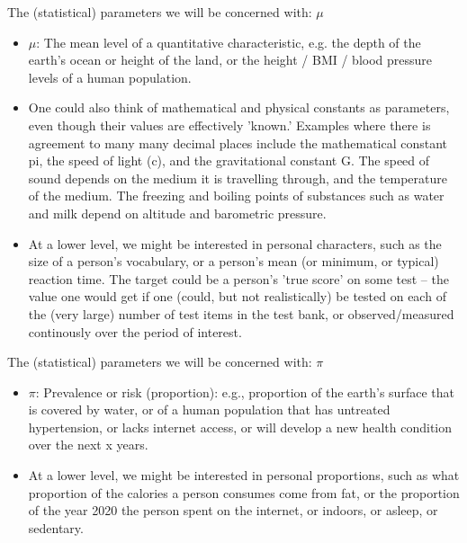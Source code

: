\documentclass[10pt]{beamer}\usepackage[]{graphicx}\usepackage[]{color}
\begin{document}
\begin{frame}{The (statistical) parameters we will be concerned with: $\mu$}
	

\begin{itemize}
	\item $\mu$: The mean level of a quantitative characteristic, e.g. the depth of the earth's ocean or height of the land, or the height / BMI / blood pressure levels of a human population. \pause 
	\item One could also think of mathematical and physical constants as parameters, even though their values are effectively 'known.' Examples where there is agreement to many many decimal places include the mathematical constant pi, the speed of light (c), and the gravitational constant G. The speed of sound depends on the medium it is travelling through, and the temperature of the medium. The freezing and boiling points of substances such as water and milk depend on altitude and barometric pressure.  \pause 
	\item At a lower level, we might be interested in personal characters, such as the size of a person's vocabulary, or a person's mean (or minimum, or typical) reaction time. The  target could be a person's 'true score' on some test -- the  value one would get if one (could, but not realistically) be tested on each of the (very large) number of test items in the test bank, or observed/measured continously over the period of interest.  

\end{itemize}

\end{frame}



\begin{frame}{The (statistical) parameters we will be concerned with: $\pi$}
	
	
	\begin{itemize}
	
		\item $\pi$: Prevalence or risk (proportion): e.g.,  proportion of the earth's surface that is covered by water, or of a human population that has untreated hypertension, or lacks internet access, or will develop a new health condition over the next x years. \pause 
		\item At a lower level, we might be interested in personal proportions, such as what proportion of the calories a person consumes come from fat, or the proportion of the year 2020 the person spent on the internet, or indoors, or asleep, or sedentary.	
	\end{itemize}
	
\end{frame}
\end{document}
